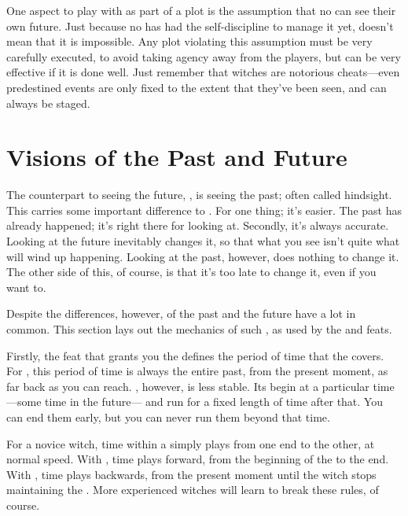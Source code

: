 One aspect to play with as part of a plot is the assumption that no  can see their own future.
Just because no  has had the self-discipline to manage it yet, doesn't mean that it is impossible.
Any plot violating this assumption must be very carefully executed, to avoid taking agency away from the players, but can be very effective if it is done well.
Just remember that witches are notorious cheats---even predestined events are only fixed to the extent that they've been seen, and can always be staged.

\section{Visions of the Past and Future}

The counterpart to seeing the future, {\foretelling}, is seeing the past; often called hindsight.
This carries some important difference to {\foretelling}.
For one thing; it's easier.
The past has already happened; it's right there for looking at.
Secondly, it's always accurate.
Looking at the future inevitably changes it, so that what you see isn't quite what will wind up happening.
Looking at the past, however, does nothing to change it.
The other side of this, of course, is that it's too late to change it, even if you want to.

Despite the differences, however, {\visions} of the past and the future have a lot in common.
This section lays out the mechanics of such {\visions}, as used by the  and  feats.

Firstly, the feat that grants you the {\vision} defines the period of time that the {\vision} covers.
For , this period of time is always the entire past, from the present moment, as far back as you can reach.
, however, is less stable.
Its {\visions} begin at a particular time---some time in the future--- and run for a fixed length of time after that.
You can end them early, but you can never run them beyond that time.

For a novice witch, time within a {\vision} simply plays from one end to the other, at normal speed.
With , time plays forward, from the beginning of the {\vision} to the end.
With , time plays backwards, from the present moment until the witch stops maintaining the {\vision}.
More experienced witches will learn to break these rules, of course.

